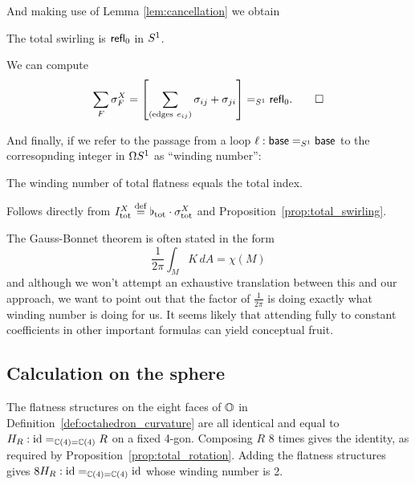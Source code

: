 And making use of Lemma \ref{lem:cancellation} we obtain
\begin{myprop}The total swirling is \( \mathsf{refl}_0 \) in \( S^1 \).\label{prop:total_swirling}
\end{myprop}
\begin{myproof}We can compute
\[\sum_F\sigma^X_F=\left[\sum_{(\mathrm{edges\ }e_{ij})}\sigma_{ij}+\sigma_{ji}\right]=_{\so}\refl_0.\qedhere\]
\end{myproof}

And finally, if we refer to the passage from a loop \( \ell:\mathsf{base}=_{S^1} \mathsf{base} \) to the corresopnding integer in \( \Omega S^1 \) as ``winding number'':

\begin{mythm}\label{thm:total_index_total_curvature}The winding number of total flatness equals the total index.
\end{mythm}
\begin{myproof}
Follows directly from \( I^X_{\mathrm{tot}}\stackrel{\mathrm{def}}{=}\flat_{\mathrm{tot}}\cdot \sigma^X_{\mathrm{tot}} \) and Proposition~\ref{prop:total_swirling}.
\end{myproof}

\begin{mynote}
The Gauss-Bonnet theorem is often stated in the form \[\frac{1}{2\pi}\int_M K\,dA=\chi(M)\] and although we won't attempt an exhaustive translation between this and our approach, we want to point out that the factor of \( \frac{1}{2\pi} \) is doing exactly what winding number is doing for us. It seems likely that attending fully to constant coefficients in other important formulas can yield conceptual fruit.
\end{mynote}

\subsection{Calculation on the sphere}
The flatness structures on the eight faces of \( \mathbb{O} \) in Definition~\ref{def:octahedron_curvature} are all identical and equal to \( H_R:\text{id}=_{\mathbb{C}(4)=\mathbb{C}(4)}R \) on a fixed 4-gon. Composing \( R \) 8 times gives the identity, as required by Proposition~\ref{prop:total_rotation}. Adding the flatness structures gives \( 8H_R:\text{id}=_{\mathbb{C}(4)=\mathbb{C}(4)}\text{id} \) whose winding number is 2.

